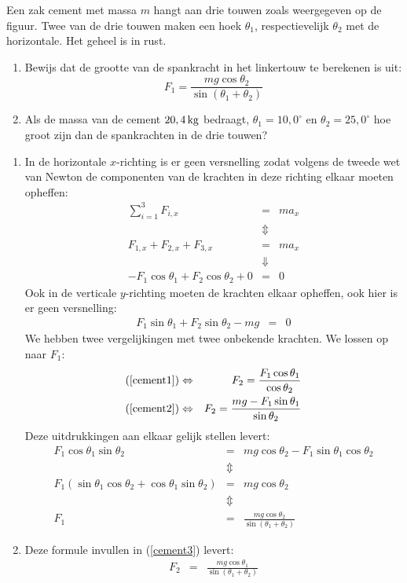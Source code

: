 \documentclass{ximera}
\begin{document}
\begin{exercise} Een zak cement met massa $m$ hangt aan drie touwen zoals weergegeven op de figuur. Twee van de drie touwen maken een hoek $\theta_1$, respectievelijk $\theta_2$ met de horizontale. Het geheel is in rust.
\begin{enumerate}
\item Bewijs dat de grootte van de spankracht in het linkertouw te berekenen is uit:
\[
F_1=\frac{mg\cos{\theta_2}}{\sin{(\theta_1+\theta_2)}}
\]
\item Als de massa van de cement $20,4\rm\,kg$ bedraagt, $\theta_1=10,0^\circ$ en $\theta_2=25,0^\circ$ hoe groot zijn dan de spankrachten in de drie touwen?
\end{enumerate}
\begin{oplossing}
\begin{enumerate}
\item In de horizontale $x$-richting is er geen versnelling zodat volgens de tweede wet van Newton de componenten van de krachten in deze rich\-ting elkaar moeten opheffen:
\begin{eqnarray}
\sum_{i=1}^3F_{i,x}&=&ma_x\nonumber\\
&\Updownarrow&\nonumber\\
F_{1,x}+F_{2,x}+F_{3,x}&=&ma_x\nonumber\\
&\Downarrow&\nonumber\\
-F_1\cos{\theta_1}+F_2\cos{\theta_2}+0&=&0\label{cement1}
\end{eqnarray}
Ook in de verticale $y$-richting moeten de krachten elkaar opheffen,
ook hier is er geen versnelling:
\begin{eqnarray}
F_1\sin{\theta_1}+F_2\sin{\theta_2}-mg&=&0\label{cement2}
\end{eqnarray}
We hebben twee vergelijkingen met twee onbekende krachten. We lossen
op naar $F_1$:
\begin{eqnarray}
(\ref{cement1})&\Leftrightarrow&F_2=\frac{F_1\cos{\theta_1}}{\cos{\theta_2}}\label{cement3}\\
(\ref{cement2})&\Leftrightarrow&F_2=\frac{mg-F_1\sin{\theta_1}}{\sin{\theta_2}}\nonumber
\end{eqnarray}
Deze uitdrukkingen aan elkaar gelijk stellen levert:
\begin{eqnarray*}
F_1\cos{\theta_1}\sin{\theta_2}&=&mg\cos{\theta_2}-F_1\sin{\theta_1}\cos{\theta_2}\\
&\Updownarrow&\\
F_1(\sin{\theta_1}\cos{\theta_2}+\cos{\theta_1}\sin{\theta_2})&=&mg\cos{\theta_2}\\
&\Updownarrow&\\
F_1&=&\frac{mg\cos{\theta_2}}{\sin{(\theta_1+\theta_2)}}
\end{eqnarray*}
\item Deze formule invullen in (\ref{cement3}) levert:
\begin{eqnarray*}
F_2&=&\frac{mg\cos{\theta_1}}{\sin{(\theta_1+\theta_2)}}
\end{eqnarray*}
\end{enumerate}
\end{oplossing}


\end{exercise}
\end{document}

